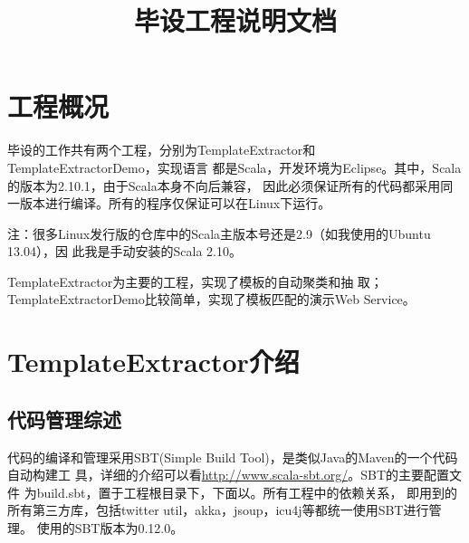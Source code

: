 \documentclass{article}
\title{毕设工程说明文档}
\author{\qjp}
\date{}
\begin{document}
\maketitle
\section{工程概况}
毕设的工作共有两个工程，分别为TemplateExtractor和TemplateExtractorDemo，实现语言
都是Scala，开发环境为Eclipse。其中，Scala的版本为2.10.1，由于Scala本身不向后兼容，
因此必须保证所有的代码都采用同一版本进行编译。所有的程序仅保证可以在Linux下运行。

注：很多Linux发行版的仓库中的Scala主版本号还是2.9（如我使用的Ubuntu 13.04），因
此我是手动安装的Scala 2.10。

TemplateExtractor为主要的工程，实现了模板的自动聚类和抽
取；TemplateExtractorDemo比较简单，实现了模板匹配的演示Web Service。
\section{TemplateExtractor介绍}
\label{sec:templateextractor}
\subsection{代码管理综述}
\newcommand*{\prj}{PROJECT\_DIR}
代码的编译和管理采用SBT(Simple Build Tool)，是类似Java的Maven的一个代码自动构建工
具，详细的介绍可以看\url{http://www.scala-sbt.org/}。SBT的主要配置文件
为build.sbt，置于工程根目录下，下面以。所有工程中的依赖关系，
即用到的所有第三方库，包括twitter util，akka，jsoup，icu4j等都统一使用SBT进行管理。
使用的SBT版本为0.12.0。
\end{document}
